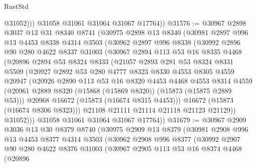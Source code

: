 \begin{lexlean}{RustStd}
\begin{coremodule}
              @31052)))
        @31058
        @31061
        @31064
        @31067
        @17764))
@31576 := @30967
    @2898
    @3037
    @13
    @31
    @8340
    @8741
    (@30975
      @2898
      @13
      @8340
      (@30981
        @2897
        @996
        @13
        @4453
        @8338
        @4314
        @3503
        (@30962
          @2897
          @996
          @8338
          (@30992
            @2896
            @90
            @280
            @4622
            @8337
            @31003
            (@30967
              @2894
              @113
              @53
              @16
              @8335
              @4468
              (@20896
                @2894
                @53
                @8324
                @8333
                (@21057
                  @2893
                  @281
                  @53
                  @8324
                  @8331
                  @5509
                  (@20927
                    @2892
                    @53
                    @280
                    @4777
                    @8323
                    @8330
                    @4553
                    @8305
                    @4559
                    @20947
                    (@20926
                      @2890
                      @113
                      @53
                      @16
                      @8320
                      @4453
                      @4468
                      @4553
                      @8314
                      @4559
                      (@20961 @2889 @8320 (@15868 (@15869 @8320)) (@15873 (@15875 @2889 @53)))
                      @20968
                      @16672
                      (@15873 (@16674 @8315 @4453)))
                    @16672
                    (@15873 (@16674 @8306 @8323)))
                  @21108
                  @21111
                  @21114
                  @21118
                  @21123
                  @21129))
              @31052)))
        @31058
        @31061
        @31064
        @31067
        @17764))
@31679 := @30967
    @2909
    @3036
    @13
    @30
    @8379
    @8740
    (@30975
      @2909
      @13
      @8379
      (@30981
        @2908
        @996
        @13
        @4453
        @8377
        @4314
        @3503
        (@30962
          @2908
          @996
          @8377
          (@30992
            @2907
            @90
            @280
            @4622
            @8376
            @31003
            (@30967
              @2905
              @113
              @53
              @16
              @8374
              @4468
              (@20896

\end{coremodule}
\end{lexlean}
